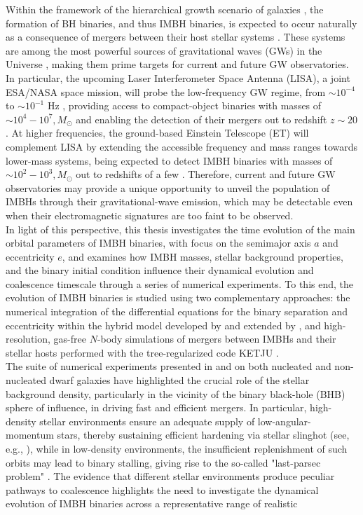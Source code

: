 \documentclass[12pt,twoside,openany]{book}
\begin{document}
Within the framework of the hierarchical growth scenario of galaxies \parencite{White_1978}, the formation of BH binaries, and thus IMBH binaries, is expected to occur naturally as a consequence of mergers between their host stellar systems \parencite{Maiolino_2024}. These systems are among the most powerful sources of gravitational waves (GWs) in the Universe \parencite{Maggiore_book}, making them prime targets for current and future GW observatories. In particular, the upcoming Laser Interferometer Space Antenna (LISA), a joint ESA/NASA space mission, will probe the low-frequency GW regime, from $\sim 10^{-4}$ to $\sim 10^{-1}$ Hz \parencite{Amaro-Seoane_2017,Amaro-Seaone_2023}, providing access to compact-object binaries with masses of $\sim10^4-10^7,M_\odot$ and enabling the detection of their mergers out to redshift $z\sim20$ \parencite{Colpi_2024}. At higher frequencies, the ground-based Einstein Telescope (ET) will complement LISA by extending the accessible frequency and mass ranges towards lower-mass systems, being expected to detect IMBH binaries with masses of $\sim10^2-10^3,M_\odot$ out to redshifts of a few \parencite{ET_book}. Therefore, current and future GW observatories may provide a unique opportunity to unveil the population of IMBHs through their gravitational-wave emission, which may be detectable even when their electromagnetic signatures are too faint to be observed.\\In light of this perspective, this thesis investigates the time evolution of the main orbital parameters of IMBH binaries, with focus on the semimajor axis $a$ and eccentricity $e$, and examines how IMBH masses, stellar background properties, and the binary initial condition influence their dynamical evolution and coalescence timescale through a series of numerical experiments. To this end, the evolution of IMBH binaries is studied using two complementary approaches: the numerical integration of the differential equations for the binary separation and eccentricity within the hybrid model developed by \textcite{Quinlan_1996} and extended by \textcite{Sesana_2010}, and high-resolution, gas-free $N$-body simulations of mergers between IMBHs and their stellar hosts performed with the tree-regularized code KETJU \parencite{Mannerkoski_2023}.\\The suite of numerical experiments presented in \textcite{Khan_2021} and \textcite{Khan_2024} on both nucleated and non-nucleated dwarf galaxies have highlighted the crucial role of the stellar background density, particularly in the vicinity of the binary black-hole (BHB) sphere of influence, in driving fast and efficient mergers. In particular, high-density stellar environments ensure an adequate supply of low-angular-momentum stars, thereby sustaining efficient hardening via stellar slinghot (see, e.g., \citealt{Mikkola_1992}), while in low-density environments, the insufficient replenishment of such orbits may lead to binary stalling, giving rise to the so-called "last-parsec problem" \parencite{Milosavljevic_2003}. The evidence that different stellar environments produce peculiar pathways to coalescence highlights the need to investigate the dynamical evolution of IMBH binaries across a representative range of realistic 
\end{document}
